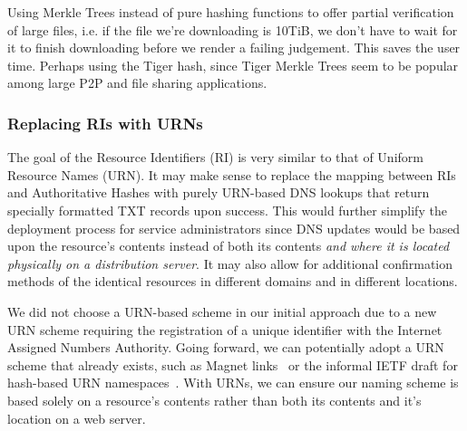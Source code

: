 Using Merkle Trees instead of pure hashing functions to offer partial
verification of large files, i.e. if the file we're downloading is 10TiB, we
don't have to wait for it to finish downloading before we render a failing
judgement. This saves the user time. Perhaps using the Tiger hash, since Tiger
Merkle Trees seem to be popular among large P2P and file sharing applications.

\subsubsection{Replacing RIs with URNs}

The goal of the Resource Identifiers (RI) is very similar to that of Uniform
Resource Names (URN). It may make sense to replace the mapping between RIs and
Authoritative Hashes with purely URN-based DNS lookups that return specially
formatted TXT records upon success. This would further simplify the deployment
process for service administrators since DNS updates would be based upon the
resource's contents instead of both its contents \textit{and where it is located
physically on a distribution server}. It may also allow for additional
confirmation methods of the identical resources in different domains and in
different locations.

We did not choose a URN-based scheme in our initial approach due to a new URN
scheme requiring the registration of a unique identifier with the Internet
Assigned Numbers Authority. Going forward, we can potentially adopt a URN scheme
that already exists, such as Magnet links~\cite{MagnetLinks} or the informal
IETF draft for hash-based URN namespaces~\cite{draft-URN}. With URNs, we can
ensure our naming scheme is based solely on a resource's contents rather than
both its contents and it's location on a web server.
